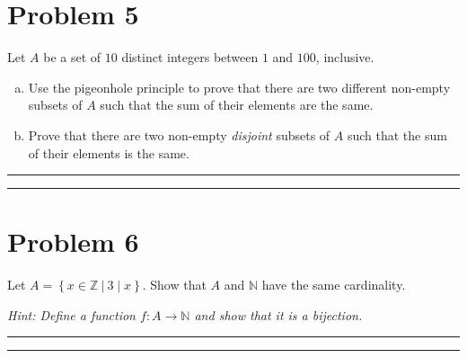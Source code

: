 \documentclass{article}
\theoremstyle{definition}
\newenvironment{solution}{\bigskip\hrule{\hfill}}{\bigskip\hrule{\hfill}} %
\begin{document}

\newpage


\section*{Problem 5}
Let $A$ be a set of $10$ distinct integers between $1$ and $100$, inclusive.
\begin{enumerate}[a)] %
    \item Use the pigeonhole principle to prove that there are two different non-empty subsets of $A$ such that the sum of their elements are the same.
    \item Prove that there are two non-empty \emph{disjoint} subsets of $A$ such that the sum of their elements is the same.
\end{enumerate}
\begin{solution}


\end{solution}


\newpage


\section*{Problem 6}
Let $A=\left\{x\in\mathbb{Z}~\big\vert~3\mid x\right\}$. Show that $A$ and $\mathbb{N}$ have the same cardinality. \medskip

\emph{Hint: Define a function $f:A\longrightarrow\mathbb{N}$ and show that it is a bijection.}
\begin{solution}


\end{solution}
\end{document}
